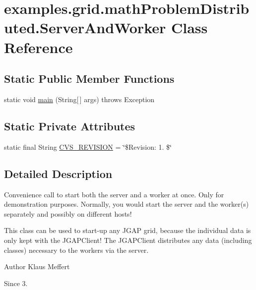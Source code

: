 \hypertarget{classexamples_1_1grid_1_1math_problem_distributed_1_1_server_and_worker}{\section{examples.\-grid.\-math\-Problem\-Distributed.\-Server\-And\-Worker Class Reference}
\label{classexamples_1_1grid_1_1math_problem_distributed_1_1_server_and_worker}
}
\subsection*{Static Public Member Functions}
\begin{DoxyCompactItemize}
\item 
static void \hyperlink{classexamples_1_1grid_1_1math_problem_distributed_1_1_server_and_worker_a07c1a14bb0efa9b96912642977bb8986}{main} (String\mbox{[}$\,$\mbox{]} args)  throws Exception 
\end{DoxyCompactItemize}
\subsection*{Static Private Attributes}
\begin{DoxyCompactItemize}
\item 
static final String \hyperlink{classexamples_1_1grid_1_1math_problem_distributed_1_1_server_and_worker_a5ac8aaa86ffce36a819b307b1bcb9be6}{C\-V\-S\-\_\-\-R\-E\-V\-I\-S\-I\-O\-N} = \char`\"{}\$Revision\-: 1. \$\char`\"{}
\end{DoxyCompactItemize}


\subsection{Detailed Description}
Convenience call to start both the server and a worker at once. Only for demonstration purposes. Normally, you would start the server and the worker(s) separately and possibly on different hosts!

This class can be used to start-\/up any J\-G\-A\-P grid, because the individual data is only kept with the J\-G\-A\-P\-Client! The J\-G\-A\-P\-Client distributes any data (including classes) necessary to the workers via the server.

\begin{DoxyAuthor}{Author}
Klaus Meffert 
\end{DoxyAuthor}
\begin{DoxySince}{Since}
3. 
\end{DoxySince}


